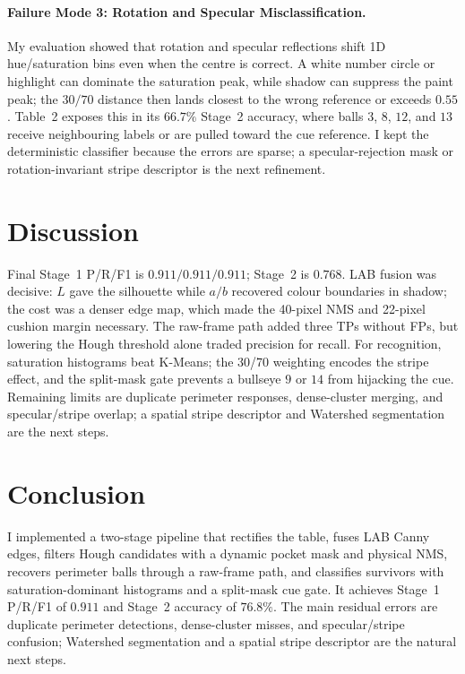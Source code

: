 \documentclass[12pt,a4paper]{article}
\begin{document}
\paragraph{Failure Mode 3: Rotation and Specular Misclassification.}
My evaluation showed that rotation and specular reflections shift 1D hue/saturation bins even when the centre is correct. A white number circle or highlight can dominate the saturation peak, while shadow can suppress the paint peak; the $30/70$ distance then lands closest to the wrong reference or exceeds $0.55$. Table~2 exposes this in its $66.7\%$ Stage~2 accuracy, where balls $3$, $8$, $12$, and $13$ receive neighbouring labels or are pulled toward the cue reference. I kept the deterministic classifier because the errors are sparse; a specular-rejection mask or rotation-invariant stripe descriptor is the next refinement.

\section{Discussion}

Final Stage~1 P/R/F1 is $0.911/0.911/0.911$; Stage~2 is $0.768$. LAB fusion was decisive: $L$ gave the silhouette while $a/b$ recovered colour boundaries in shadow; the cost was a denser edge map, which made the 40-pixel NMS and 22-pixel cushion margin necessary. The raw-frame path added three TPs without FPs, but lowering the Hough threshold alone traded precision for recall. For recognition, saturation histograms beat K-Means; the 30/70 weighting encodes the stripe effect, and the split-mask gate prevents a bullseye $9$ or $14$ from hijacking the cue. Remaining limits are duplicate perimeter responses, dense-cluster merging, and specular/stripe overlap; a spatial stripe descriptor and Watershed segmentation are the next steps.

\section{Conclusion}

I implemented a two-stage pipeline that rectifies the table, fuses LAB Canny edges, filters Hough candidates with a dynamic pocket mask and physical NMS, recovers perimeter balls through a raw-frame path, and classifies survivors with saturation-dominant histograms and a split-mask cue gate. It achieves Stage~1 P/R/F1 of $0.911$ and Stage~2 accuracy of $76.8\%$. The main residual errors are duplicate perimeter detections, dense-cluster misses, and specular/stripe confusion; Watershed segmentation and a spatial stripe descriptor are the natural next steps.
\end{document}
